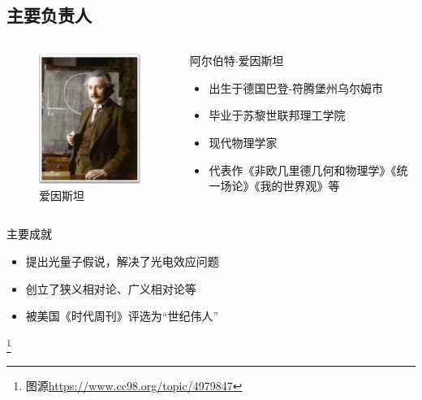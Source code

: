 \documentclass[utf8]{beamer}
\begin{document}
\subsection{主要负责人}
\begin{frame}
	\begin{columns}
		\begin{column}{.4\linewidth}
			\begin{figure}[h]
				\centering
				\includegraphics[width=0.5\linewidth]{p1}
				\caption{爱因斯坦}
				\label{fig:1}
			\end{figure}	
		\end{column}
		\begin{column}{.7\linewidth}	
		{阿尔伯特$\cdot$爱因斯坦}
		\begin{itemize}
		\item 出生于德国巴登-符腾堡州乌尔姆市
		\item \alert{毕业于苏黎世联邦理工学院}
		\item 现代物理学家
		\item 代表作《非欧几里德几何和物理学》《统一场论》《我的世界观》等
		\end{itemize}
	\end{column}
\end{columns}
\vspace{3ex}
{主要成就}
\begin{itemize}
\item 提出\alert{光量子假说}，解决了\alert{光电效应问题}
\item 创立了狭义相对论、广义相对论等
\item 被美国《时代周刊》评选为\alert{“世纪伟人”}
\end{itemize}
\footnote{图源\href{https://www.cc98.org/topic/4979847}{https://www.cc98.org/topic/4979847}}
\end{frame}
\end{document}
